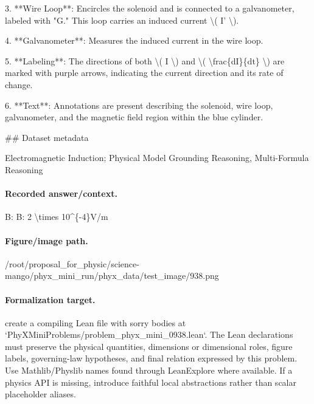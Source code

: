 3. **Wire Loop**: Encircles the solenoid and is connected to a galvanometer, labeled with "G." This loop carries an induced current \textbackslash{}( I' \textbackslash{}).

4. **Galvanometer**: Measures the induced current in the wire loop. 

5. **Labeling**: The directions of both \textbackslash{}( I \textbackslash{}) and \textbackslash{}( \textbackslash{}frac\{dI\}\{dt\} \textbackslash{}) are marked with purple arrows, indicating the current direction and its rate of change.

6. **Text**: Annotations are present describing the solenoid, wire loop, galvanometer, and the magnetic field region within the blue cylinder.

\#\# Dataset metadata

Electromagnetic Induction; Physical Model Grounding Reasoning, Multi-Formula Reasoning

\paragraph{Recorded answer/context.}
B: B: 2 \textbackslash{}times 10\textasciicircum{}\{-4\}V/m

\paragraph{Figure/image path.}
/root/proposal\_for\_physic/science-mango/phyx\_mini\_run/phyx\_data/test\_image/938.png

\paragraph{Formalization target.}
create a compiling Lean file with sorry bodies at `PhyXMiniProblems/problem\_phyx\_mini\_0938.lean`. The Lean declarations must preserve the physical quantities, dimensions or dimensional roles, figure labels, governing-law hypotheses, and final relation expressed by this problem.
Use Mathlib/Physlib names found through LeanExplore where available. If a physics API is missing, introduce faithful local abstractions rather than scalar placeholder aliases.

